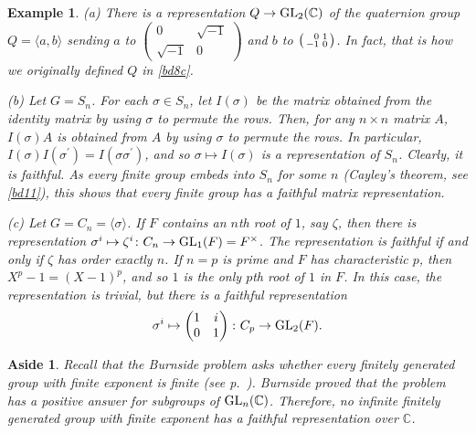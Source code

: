\documentclass[a4paper,11pt,final,openany]{memoir}%
\newtheorem{example}[X]{Example}
\newtheorem{aside}[X]{Aside}
\theoremstyle{nonumberplain}
\begin{document}
\begin{example}
\label{r1}(a) There is a representation $Q\rightarrow\operatorname{GL}_{2}(\mathbb{C})$ of
the quaternion group $Q=\langle a,b\rangle$ sending $a$ to $\left(
\begin{smallmatrix}
0 & \sqrt{-1}\\
\sqrt{-1} & 0
\end{smallmatrix}
\right)  $ and $b$ to $\left(
\begin{smallmatrix}
\hfill0 & 1\\
-1 & 0
\end{smallmatrix}
\right)  $. In fact, that is how we originally defined $Q$ in \ref{bd8c}.

(b) Let $G=S_{n}$. For each $\sigma\in S_{n}$, let $I(\sigma)$ be the matrix
obtained from the identity matrix by using $\sigma$ to permute the rows. Then,
for any $n\times n$ matrix $A$, $I(\sigma)A$ is obtained from $A$ by using
$\sigma$ to permute the rows. In particular, $I(\sigma)I(\sigma^{\prime
})=I(\sigma\sigma^{\prime})$, and so $\sigma\mapsto I(\sigma)$ is a
representation of $S_{n}$. Clearly, it is faithful. As every finite group
embeds into $S_{n}$ for some $n$ (Cayley's theorem, see \ref{bd11}), this
shows that every finite group has a faithful matrix representation.

(c) Let $G=C_{n}=\langle\sigma\rangle$. If $F$ contains an $n$th root of $1$,
say $\zeta$, then there is representation $\sigma^{i}\mapsto\zeta^{i}\colon
C_{n}\rightarrow\operatorname{GL}_{1}(F)=F^{\times}$. The representation is faithful if and
only if $\zeta$ has order exactly $n$. If $n=p$ is prime and $F$ has
characteristic $p$, then $X^{p}-1=(X-1)^{p}$, and so $1$ is the only $p$th
root of $1$ in $F$. In this case, the representation is trivial, but there is
a faithful representation%
\[
\sigma^{i}\mapsto%
\begin{pmatrix}
1 & i\\
0 & 1
\end{pmatrix}
\colon C_{p}\rightarrow\GL_{2}(F).
\]

\end{example}

\begin{aside}
\label{r1a}Recall that the Burnside problem asks whether every finitely
generated group with finite exponent is finite (see p.~\pageref{burnside}).
Burnside proved that the problem has a \textit{positive} answer for subgroups
of $\operatorname{GL}_{n}(\mathbb{C}{})$. Therefore, no infinite finitely generated group
with finite exponent has a faithful representation over $\mathbb{C}{}$.
\end{aside}
\end{document}

